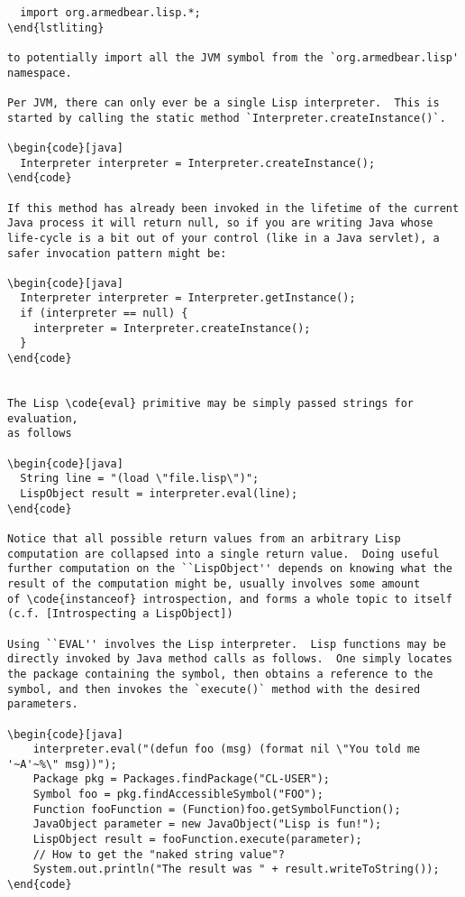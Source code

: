 \lstset{language=Java}
\begin{lstlisting}
  import org.armedbear.lisp.*;
\end{lstliting}

to potentially import all the JVM symbol from the `org.armedbear.lisp'
namespace.

Per JVM, there can only ever be a single Lisp interpreter.  This is
started by calling the static method `Interpreter.createInstance()`.

\begin{code}[java]
  Interpreter interpreter = Interpreter.createInstance();
\end{code}

If this method has already been invoked in the lifetime of the current
Java process it will return null, so if you are writing Java whose
life-cycle is a bit out of your control (like in a Java servlet), a
safer invocation pattern might be:

\begin{code}[java]
  Interpreter interpreter = Interpreter.getInstance();
  if (interpreter == null) {
    interpreter = Interpreter.createInstance();
  }
\end{code}


The Lisp \code{eval} primitive may be simply passed strings for evaluation,
as follows

\begin{code}[java]
  String line = "(load \"file.lisp\")";
  LispObject result = interpreter.eval(line);
\end{code}

Notice that all possible return values from an arbitrary Lisp
computation are collapsed into a single return value.  Doing useful
further computation on the ``LispObject'' depends on knowing what the
result of the computation might be, usually involves some amount
of \code{instanceof} introspection, and forms a whole topic to itself
(c.f. [Introspecting a LispObject])

Using ``EVAL'' involves the Lisp interpreter.  Lisp functions may be
directly invoked by Java method calls as follows.  One simply locates
the package containing the symbol, then obtains a reference to the
symbol, and then invokes the `execute()` method with the desired
parameters.

\begin{code}[java]
    interpreter.eval("(defun foo (msg) (format nil \"You told me '~A'~%\" msg))");
    Package pkg = Packages.findPackage("CL-USER");
    Symbol foo = pkg.findAccessibleSymbol("FOO"); 
    Function fooFunction = (Function)foo.getSymbolFunction();
    JavaObject parameter = new JavaObject("Lisp is fun!");
    LispObject result = fooFunction.execute(parameter);
    // How to get the "naked string value"?
    System.out.println("The result was " + result.writeToString()); 
\end{code}


\end{lstlisting}

